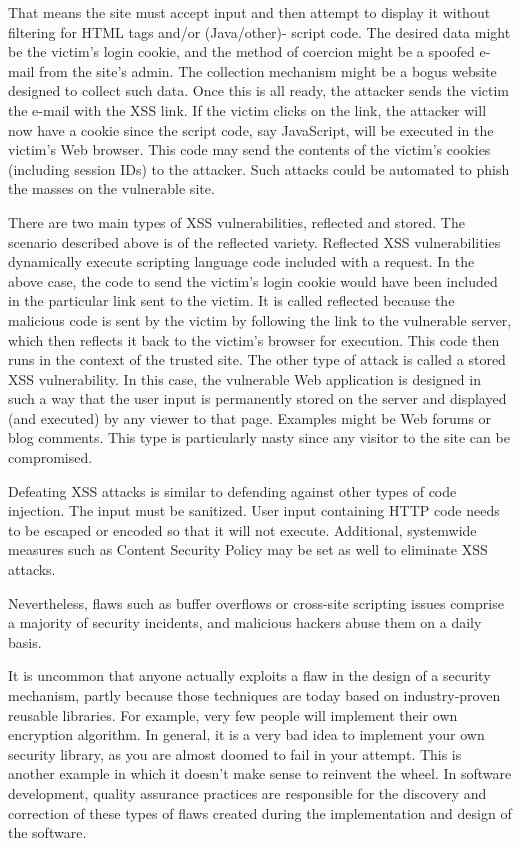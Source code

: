  

That means the site must accept input
and then attempt to display it without filtering for HTML tags and/or (Java/other)-
script code. 
The desired data might be the victim’s login cookie, and the method of coercion might be a spoofed e-mail from the site’s admin. The collection mechanism might be a bogus website designed to collect such data. Once this is all ready, the attacker sends the victim the e-mail with the XSS link. If the victim clicks on the link, the attacker will now have a cookie since the script code, say JavaScript, will be executed in the victim’s Web browser. This code may send the contents of the victim’s cookies (including session IDs) to the attacker. Such attacks could be automated to phish the masses on the vulnerable site.

There are two main types of XSS vulnerabilities, reflected and stored. The
scenario described above is of the reflected variety. Reflected XSS vulnerabilities
dynamically execute scripting language code included with a request. In the above
case, the code to send the victim’s login cookie would have been included in the
particular link sent to the victim. It is called reflected because the malicious code is
sent by the victim by following the link to the vulnerable server, which then reflects
it back to the victim’s browser for execution. This code then runs in the context of
the trusted site. The other type of attack is called a stored XSS vulnerability. In this
case, the vulnerable Web application is designed in such a way that the user input is
permanently stored on the server and displayed (and executed) by any viewer to that
page. Examples might be Web forums or blog comments. This type is particularly
nasty since any visitor to the site can be compromised.

Defeating XSS attacks is similar to defending against other types of code injection.
The input must be sanitized. User input containing HTTP code needs to be escaped or encoded so that it will not execute. Additional, systemwide measures
such as Content Security Policy may be set as well to eliminate XSS attacks.

Nevertheless, flaws such as buffer overflows
or cross-site scripting issues comprise a majority of security incidents, and malicious
hackers abuse them on a daily basis. 

It is uncommon that anyone actually exploits
a flaw in the design of a security mechanism, partly because those techniques are
today based on industry-proven reusable libraries. For example, very few people will
implement their own encryption algorithm. In general, it is a very bad idea to implement
your own security library, as you are almost doomed to fail in your attempt.
This is another example in which it doesn't make sense to reinvent the wheel.
In software development, quality assurance practices are responsible for the
discovery and correction of these types of flaws created during the implementation
and design of the software.

